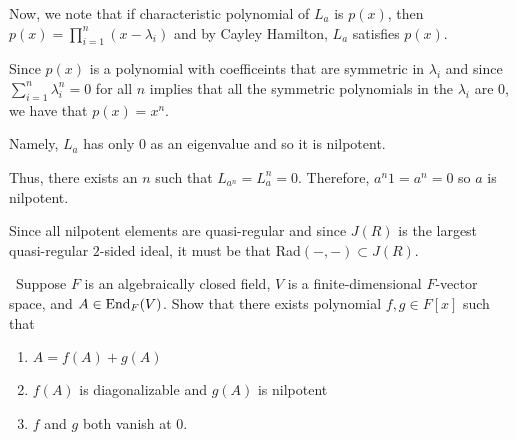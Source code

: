 \documentclass[12pt]{AlgebraQual}
\begin{document}
\begin{solution}
\begin{enumerate}[label=(\alph*)]
    Now, we note that if characteristic polynomial of $L_a$ is $p(x)$, then $p(x)=\prod_{i=1}^n(x-\lambda_i)$ and by Cayley Hamilton, $L_a$ satisfies $p(x)$.

    Since $p(x)$ is a polynomial with coefficeints that are symmetric in $\lambda_i$ and since $\sum_{i=1}^n\lambda_i^n=0$ for all $n$ implies that all the symmetric polynomials in the $\lambda_i$ are $0$, we have that $p(x)=x^n$.

    Namely, $L_a$ has only $0$ as an eigenvalue and so it is nilpotent.

    Thus, there exists an $n$ such that $L_{a^n}=L_a^n=0$. Therefore, $a^n1=a^n=0$ so $a$ is nilpotent.

    Since all nilpotent elements are quasi-regular and since $J(R)$ is the largest quasi-regular $2$-sided ideal, it must be that Rad$(-,-)\subset J(R)$.
\end{enumerate}
\end{solution}
\newpage



\begin{problem} $\,$
Suppose $F$ is an algebraically closed field, $V$ is a finite-dimensional $F$-vector space, and $A\in\text{End}_F(V)$. Show that there exists polynomial $f,g\in F[x]$ such that \begin{enumerate}[label=(\roman*)]
    \item $A=f(A)+g(A)$
    \item $f(A)$ is diagonalizable and $g(A)$ is nilpotent
    \item $f$ and $g$ both vanish at $0.$
\end{enumerate}
\end{problem}
\end{document}
